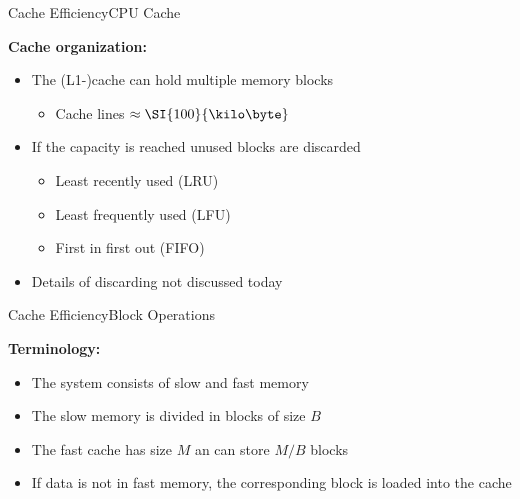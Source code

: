 \begin{frame}{Cache Efficiency}{CPU Cache}
  \vspace{-1.5em}
  \begin{figure}
    \begin{adjustbox}{width=\linewidth}
      
    \end{adjustbox}
    \label{fig:caching:cache_hirarchy2}
  \end{figure}
  \vspace{-0.3cm}
  \textbf{Cache organization:}
  \begin{itemize}
    \item<3->
      The (L1-)cache can hold multiple memory blocks
      \begin{itemize}
        \item<4->
          Cache lines $\approx\SI{100}{\kilo\byte}$
        \end{itemize}
    \item<5->
      If the capacity is reached unused blocks are discarded
      \begin{itemize}
        \item<6->
          {\color{MainA}Least recently used (LRU)}
        \item<7->
          {\color{MainA}Least frequently used (LFU)}
        \item<8->
          {\color{MainA}First in first out (FIFO)}
      \end{itemize}
      \item<9-> Details of discarding not discussed today
  \end{itemize}
\end{frame}


\begin{frame}{Cache Efficiency}{Block Operations}
  \vspace{-2.0em}
  \begin{figure}%
    \begin{adjustbox}{width=\linewidth}%
    \end{adjustbox}%
    \label{fig:caching:cache_quanting}
  \end{figure}%
  \textbf{Terminology:}
  \begin{itemize}
    \item<2->
      The system consists of slow and fast memory 
    \item<3->
      The {\color{MainA}slow memory} is divided in
      {\color{MainA}blocks of size $B$}
    \item<4->
      The {\color{MainA}fast cache} has size $M$ an can store $M/B$
      blocks
    \item<5->
      If data is not in fast memory, the corresponding block is loaded into the {\color{MainA}cache}
  \end{itemize}
\end{frame}

